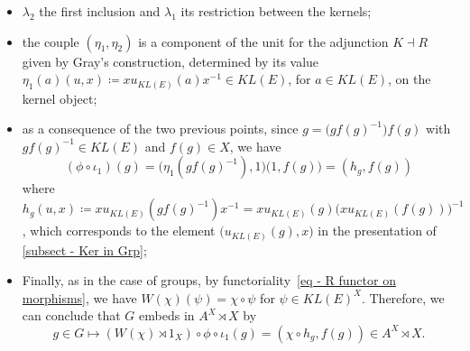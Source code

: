 \documentclass[a4paper, british, reqno]{amsart}
\newcommand*{\comp}{\circ}
\newcommand*{\eqdef}{\coloneq}
\theoremstyle{definition}
\theoremstyle{remark}
\begin{document}
\begin{itemize}
	\item \(\lambda_2\) the first inclusion and \(\lambda_1\) its restriction between the kernels;
	\item the couple \((\eta_1,\eta_2)\) is a component of the unit for the adjunction \(K\dashv R\) given by Gray's construction, determined by its value \(\eta_1(a)(u,x) \coloneq x u_{KL(E)}(a) x^{-1}\in KL(E)\), for \(a \in KL(E)\), on the kernel object;
	\item as a consequence of the two previous points, since \(g = \bigl(gf(g)^{-1}\bigr) f(g)\) with \(gf(g)^{-1} \in KL(E)\) and \(f(g) \in X\), we have
	      \[
		      (\phi \circ \iota_1)(g) = \bigl(\eta_1(gf(g)^{-1}),1\bigr) \bigl(1,f(g)\bigr) = (h_g,f(g))
	      \]
	      where \(h_g(u,x) \eqdef x u_{KL(E)}(gf(g)^{-1}) x^{-1} = x u_{KL(E)}(g) \bigl(x u_{KL(E)}(f(g))\bigr)^{-1}\), which corresponds to the element \(\bigl(u_{KL(E)}(g),x\bigr)\) in the presentation of \cref{subsect - Ker in Grp};
	\item Finally, as in the case of groups, by functoriality~\eqref{eq - R functor on morphisms}, we have \(W(\chi)(\psi)=\chi\circ \psi\) for \(\psi \in KL(E)^X\). Therefore, we can conclude that \(G\) embeds in \(A^X\rtimes X\) by
	      \[
		      g \in G \mapsto (W(\chi)\rtimes 1_X)\circ \phi\circ \iota_1(g) = (\chi \comp h_g , f(g)) \in A^X \rtimes X\text{.}
	      \]
\end{itemize}
\end{document}
